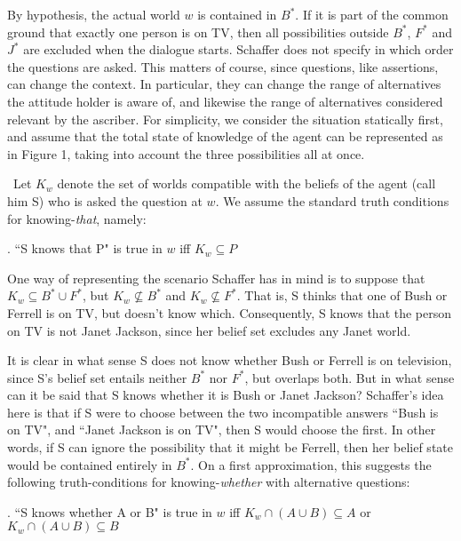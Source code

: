 

By hypothesis, the actual world $w$ is contained in $B^{*}$. If it
is part of the common ground that exactly one person is on TV,
then all possibilities outside $B^{*}$, $F^{*}$ and $J^{*}$ are
excluded when the dialogue starts. Schaffer does not specify in
which order the questions are asked. This matters of course, since
questions, like assertions, can change the context. In particular,
they can change the range of alternatives the attitude holder is
aware of, and likewise the range of alternatives considered
relevant by the ascriber. For simplicity, we consider the
situation statically first, and assume that the total state of
knowledge of the agent can be represented as in Figure 1, taking
into account the three possibilities all at once.


\ Let $K_w$ denote the set of worlds compatible with the beliefs
of the agent (call him S) who is asked the question at $w$. We
assume the standard truth conditions for knowing-\emph{that},
namely:

\ex. ``S knows that P" is true in $w$ iff $K_w \subseteq P$

One way of representing the scenario Schaffer has in mind is to
suppose that $K_{w} \subseteq B^{*}\cup F^{*}$, but $K_{w}
\nsubseteq B^{*}$ and $K_{w}\nsubseteq F^{*}$. That is, S thinks
that one of Bush or Ferrell is on TV, but doesn't know which.
Consequently, S knows that the person on TV is not Janet Jackson,
since her belief set excludes any Janet world.

It is clear in what sense S does not know whether Bush or Ferrell
is on television, since S's belief set entails neither $B^{*}$ nor
$F^{*}$, but overlaps both. But in what sense can it be said that
S knows whether it is Bush or Janet Jackson? Schaffer's idea here
is that if S were to choose between the two incompatible answers
``Bush is on TV", and ``Janet Jackson is on TV", then S would
choose the first. In other words, if S can ignore the possibility
that it might be Ferrell, then her belief state would be contained
entirely in $B^{*}$. On a first approximation, this suggests the
following truth-conditions for knowing-\emph{whether} with
alternative questions:

\ex. \label{wh} ``S knows whether A or B" is true in $w$ iff
$K_{w}\cap(A \cup B) \subseteq A$ or $K_{w}\cap(A \cup B)
\subseteq B$

